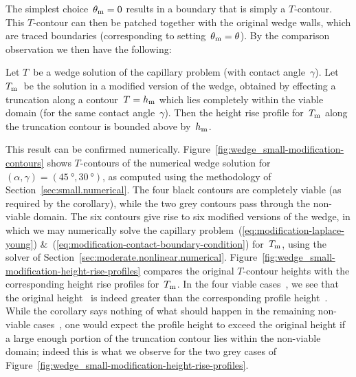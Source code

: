 The simplest choice~$\theta_{\mathrm{m}} = 0$
results in a boundary that is simply a $T$-contour.
This $T$-contour can then be patched together
with the original wedge walls,
which are traced boundaries
(corresponding to setting~$\theta_{\mathrm{m}} = \theta$).
By the comparison observation we then have the following:
\begin{corollary*}
  Let $T$~be a wedge solution of the capillary problem
  (with contact angle~$\gamma$).
  Let $T_{\mathrm{m}}$~be the solution in a modified version of the wedge,
  obtained by effecting a truncation along a contour~$T = h_{\mathrm{m}}$
  which lies completely within the viable domain
  (for the same contact angle~$\gamma$).
  Then the height rise profile for~$T_{\mathrm{m}}$ along the truncation contour
  is bounded above by~$h_{\mathrm{m}}$.
\end{corollary*}
This result can be confirmed numerically.
Figure~\ref{fig:wedge_small-modification-contours}
shows $T$-contours of the numerical wedge solution
for~$(\alpha, \gamma) = (\SI{45}{\degree}, \SI{30}{\degree})$,
as computed using the methodology of Section~\ref{sec:small.numerical}.
The four black contours are completely viable
(as required by the corollary),
while the two grey contours pass through the non-viable domain.
The six contours give rise to six modified versions of the wedge,
in which we may numerically solve
the capillary problem~(\ref{eq:modification-laplace-young})
\&~(\ref{eq:modification-contact-boundary-condition})
for~$T_{\mathrm{m}}$,
using the solver of Section~\ref{sec:moderate.nonlinear.numerical}.
Figure~\ref{fig:wedge_small-modification-height-rise-profiles}
compares the original $T$-contour heights
with the corresponding height rise profiles for~$T_{\mathrm{m}}$.
In the four viable cases~,
we see that the original height~
is indeed greater than the corresponding profile height~.
While the corollary says nothing of what should happen
in the remaining non-viable cases~,
one would expect the profile height to exceed the original height
if a large enough portion of the truncation contour
lies within the non-viable domain;
indeed this is what we observe
for the two grey cases
of Figure~\ref{fig:wedge_small-modification-height-rise-profiles}.

